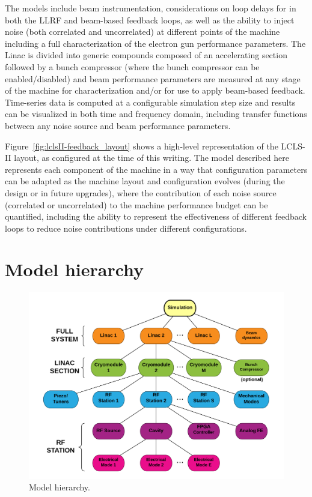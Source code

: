 \documentclass[a4paper,12pt]{article}
\begin{document}
The models include beam instrumentation, considerations on loop delays for in both the LLRF and beam-based feedback loops, as well as the ability to inject noise (both correlated and uncorrelated) at different points of the machine including a full characterization of the electron gun performance parameters. The Linac is divided into generic compounds composed of an accelerating section followed by a bunch compressor (where the bunch compressor can be enabled/disabled) and beam performance parameters are measured at any stage of the machine for characterization and/or for use to apply beam-based feedback. Time-series data is computed at a configurable simulation step size and results can be visualized in both time and frequency domain, including transfer functions between any noise source and beam performance parameters.

Figure~\ref{fig:lclsII-feedback_layout} shows a high-level representation of the LCLS-II layout, as configured at the time of this writing. The model described here represents each component of the machine in a way that configuration parameters can be adapted as the machine layout and configuration evolves (during the design or in future upgrades), where the contribution of each noise source (correlated or uncorrelated) to the machine performance budget can be quantified, including the ability to represent the effectiveness of different feedback loops to reduce noise contributions under different configurations.

\section{Model hierarchy}

\begin{figure}
\centering
\includegraphics[scale=0.6]{../figures/Model_hierarchy.png}
\caption{Model hierarchy.}
\label{fig:model_hierarchy}
\end{figure}
\end{document}
